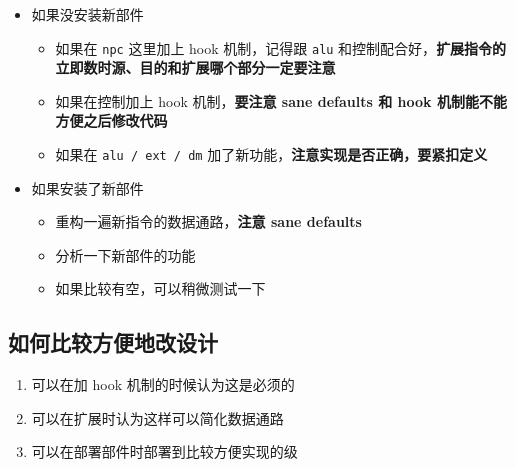 \documentclass[12pt,AutoFakeBold]{article}
\providecommand{\tightlist}{%
  \setlength{\itemsep}{0pt}\setlength{\parskip}{0pt}}
\begin{document}
\begin{itemize}
\tightlist
\item
  如果没安装新部件

  \begin{itemize}
  \tightlist
  \item
    如果在 \texttt{npc} 这里加上 hook 机制，记得跟 \texttt{alu}
    和控制配合好，\textbf{扩展指令的立即数时源、目的和扩展哪个部分一定要注意}
  \item
    如果在控制加上 hook 机制，\textbf{要注意 sane defaults 和 hook
    机制能不能方便之后修改代码}
  \item
    如果在 \texttt{alu\ /\ ext\ /\ dm}
    加了新功能，\textbf{注意实现是否正确，要紧扣定义}
  \end{itemize}
\item
  如果安装了新部件

  \begin{itemize}
  \tightlist
  \item
    重构一遍新指令的数据通路，\textbf{注意 sane defaults}
  \item
    分析一下新部件的功能
  \item
    如果比较有空，可以稍微测试一下
  \end{itemize}
\end{itemize}

\hypertarget{ux5982ux4f55ux6bd4ux8f83ux65b9ux4fbfux5730ux6539ux8bbeux8ba1}{%
\subsection{如何比较方便地改设计}\label{ux5982ux4f55ux6bd4ux8f83ux65b9ux4fbfux5730ux6539ux8bbeux8ba1}}

\begin{enumerate}
\def\labelenumi{\arabic{enumi}.}
\tightlist
\item
  可以在加 hook 机制的时候认为这是必须的
\item
  可以在扩展时认为这样可以简化数据通路
\item
  可以在部署部件时部署到比较方便实现的级
\end{enumerate}
\end{document}
